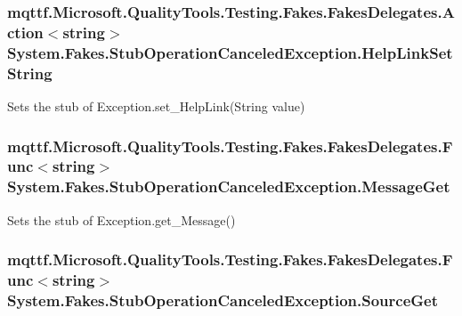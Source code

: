 \hypertarget{class_system_1_1_fakes_1_1_stub_operation_canceled_exception_a3e62657377c7d8446161af187de2fba4}{
\subsubsection[{Help\-Link\-Set\-String}]{\setlength{\rightskip}{0pt plus 5cm}mqttf.\-Microsoft.\-Quality\-Tools.\-Testing.\-Fakes.\-Fakes\-Delegates.\-Action$<$string$>$ System.\-Fakes.\-Stub\-Operation\-Canceled\-Exception.\-Help\-Link\-Set\-String}}\label{class_system_1_1_fakes_1_1_stub_operation_canceled_exception_a3e62657377c7d8446161af187de2fba4}


Sets the stub of Exception.\-set\-\_\-\-Help\-Link(\-String value)

\hypertarget{class_system_1_1_fakes_1_1_stub_operation_canceled_exception_a6bdbfc4677c8895af323b15419306ea3}{
\subsubsection[{Message\-Get}]{\setlength{\rightskip}{0pt plus 5cm}mqttf.\-Microsoft.\-Quality\-Tools.\-Testing.\-Fakes.\-Fakes\-Delegates.\-Func$<$string$>$ System.\-Fakes.\-Stub\-Operation\-Canceled\-Exception.\-Message\-Get}}\label{class_system_1_1_fakes_1_1_stub_operation_canceled_exception_a6bdbfc4677c8895af323b15419306ea3}


Sets the stub of Exception.\-get\-\_\-\-Message()

\hypertarget{class_system_1_1_fakes_1_1_stub_operation_canceled_exception_aa9d783c6f230bc4831a64d6aa0beb769}{
\subsubsection[{Source\-Get}]{\setlength{\rightskip}{0pt plus 5cm}mqttf.\-Microsoft.\-Quality\-Tools.\-Testing.\-Fakes.\-Fakes\-Delegates.\-Func$<$string$>$ System.\-Fakes.\-Stub\-Operation\-Canceled\-Exception.\-Source\-Get}}\label{class_system_1_1_fakes_1_1_stub_operation_canceled_exception_aa9d783c6f230bc4831a64d6aa0beb769}


